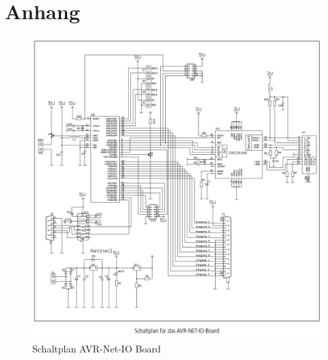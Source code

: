 \chapter{Anhang}

\begin{figure}[H]
  \includegraphics[width=14cm]{content/pictures/AVR-NET-IO_schaltplan.png}
  \caption{Schaltplan AVR-Net-IO Board}
  \label{anh:schaltplan}
\end{figure}